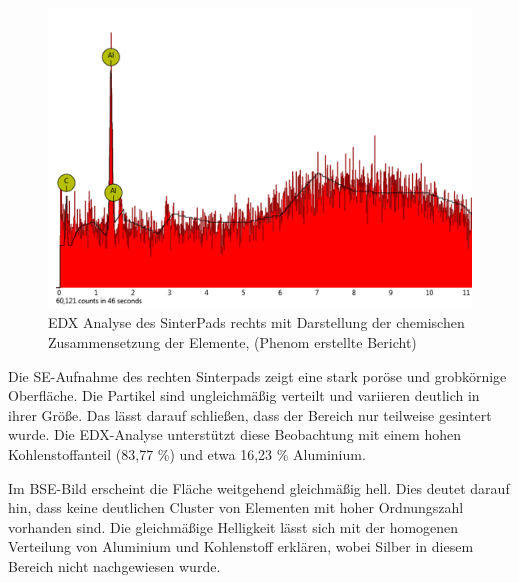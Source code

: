 \begin{figure}[H]
\begin{minipage}{.5\textwidth}
          \label{REM-Aufnahme(SE Komposit, 4000x) des SinterPads rechts mit Punktanalyse}
        \end{minipage}
        
        \end{figure}
        \begin{figure}[H]
            \centering
            \includegraphics[scale=0.95]{Bilder/sinterpadrechts}
            \caption{EDX Analyse des SinterPads rechts mit Darstellung der chemischen Zusammensetzung der Elemente, (Phenom erstellte Bericht)}
            
            \vspace{0.2cm}
            \label{Abb.2: EDX Analyse des SinterPads rechts}
        \end{figure} 
        Die SE-Aufnahme des rechten Sinterpads zeigt eine stark poröse und grobkörnige Oberfläche. Die Partikel sind ungleichmäßig verteilt und variieren deutlich in ihrer Größe. Das lässt darauf schließen, dass der Bereich nur teilweise gesintert wurde. Die EDX-Analyse unterstützt diese Beobachtung mit einem hohen Kohlenstoffanteil (83,77 \%) und etwa 16,23 \% Aluminium.

        Im BSE-Bild erscheint die Fläche weitgehend gleichmäßig hell. Dies deutet darauf hin, dass keine deutlichen Cluster von Elementen mit hoher Ordnungszahl vorhanden sind. Die gleichmäßige Helligkeit lässt sich mit der homogenen Verteilung von Aluminium und Kohlenstoff erklären, wobei Silber in diesem Bereich nicht nachgewiesen wurde.

